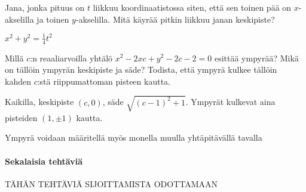 \begin{tehtavasivu}
\begin{tehtava}
	Jana, jonka pituus on $t$ liikkuu koordinaatistossa siten, että sen toinen pää on $x$-akselilla ja toinen $y$-akselilla. Mitä käyrää pitkin liikkuu janan keskipiste?
	\begin{vastaus}
		$x^2+y^2=\frac{1}{4}t^2$
	\end{vastaus}
\end{tehtava}

\begin{tehtava}
	Millä $c$:n reaaliarvoilla yhtälö $x^2-2xc+y^2-2c-2 = 0$ esittää ympyrää? Mikä on tällöin ympyrän keskipiste ja säde? Todista, että ympyrä kulkee tällöin kahden $c$:stä riippumattoman pisteen kautta.
	\begin{vastaus}
		Kaikilla, keskipiste $(c,0)$, säde $\sqrt{(c-1)^2+1}$. Ympyrät kulkevat aina pisteiden $(1,\pm 1)$ kautta.
	\end{vastaus}
\end{tehtava}

\begin{tehtava}
	Ympyrä voidaan määritellä myös monella muulla yhtäpitävällä tavalla
	\begin{vastaus}
	\end{vastaus}
\end{tehtava}

\paragraph*{Sekalaisia tehtäviä}

TÄHÄN TEHTÄVIÄ SIJOITTAMISTA ODOTTAMAAN







\end{tehtavasivu}
